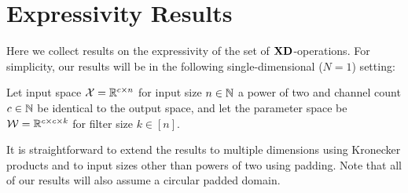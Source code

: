
\section{Expressivity Results}\label{app:expressivity}

Here we collect results on the expressivity of the set of $\mathbf{XD}$-operations.
For simplicity, our results will be in the following single-dimensional ($N=1$) setting:
\begin{Set}\label{app:set:single}
	Let input space $\mathcal X=\mathbb R^{c\times n}$ for input size $n\in\mathbb N$ a power of two and channel count $c\in\mathbb N$ be identical to the output space, and let the parameter space be $\mathcal W=\mathbb R^{c\times c\times k}$ for filter size $k\in[n]$.
\end{Set}
It is straightforward to extend the results to multiple dimensions using Kronecker products and to input sizes other than powers of two using padding.
Note that all of our results will also assume a circular padded domain.

